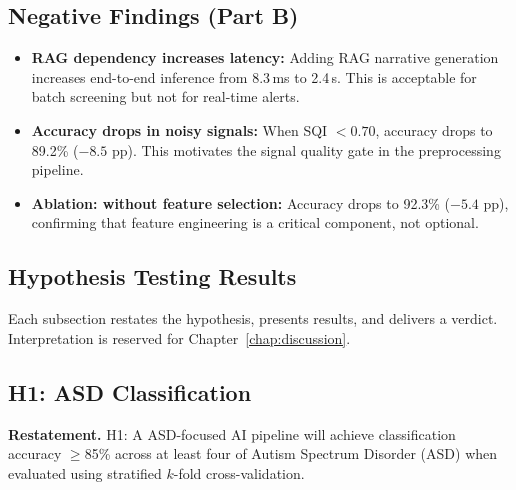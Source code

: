 \subsection{Negative Findings (Part B)}

\begin{itemize}[leftmargin=*, itemsep=3pt]
    \item \textbf{RAG dependency increases latency:} Adding RAG narrative generation increases end-to-end inference from 8.3\,ms to 2.4\,s. This is acceptable for batch screening but not for real-time alerts.
    \item \textbf{Accuracy drops in noisy signals:} When SQI $< 0.70$, accuracy drops to 89.2\% ($-8.5$ pp). This motivates the signal quality gate in the preprocessing pipeline.
    \item \textbf{Ablation: without feature selection:} Accuracy drops to 92.3\% ($-5.4$ pp), confirming that feature engineering is a critical component, not optional.
\end{itemize}

\subsection{Hypothesis Testing Results}

Each subsection restates the hypothesis, presents results, and delivers a verdict. Interpretation is reserved for Chapter~\ref{chap:discussion}.


\subsection{H1: ASD Classification}

\textbf{Restatement.} H1: A ASD-focused AI pipeline will achieve classification accuracy $\geq$85\% across at least four of Autism Spectrum Disorder (ASD) when evaluated using stratified $k$-fold cross-validation.

